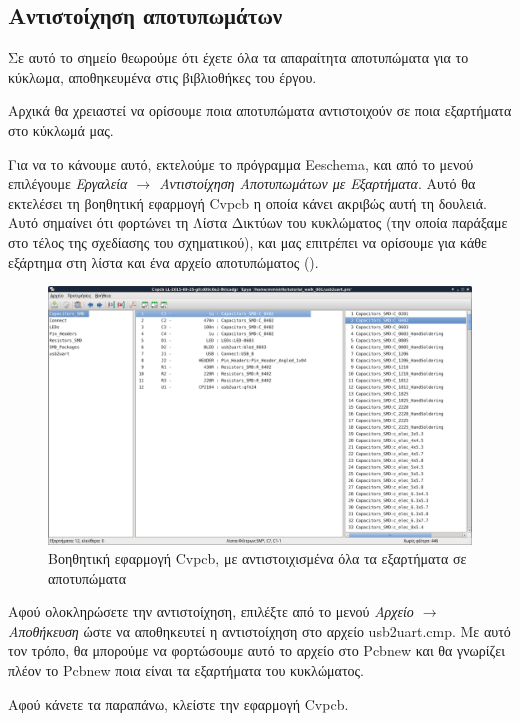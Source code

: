 \documentclass[a4paper]{article}
\begin{document}
\subsection{Αντιστοίχηση αποτυπωμάτων}
Σε αυτό το σημείο θεωρούμε ότι έχετε όλα τα απαραίτητα αποτυπώματα για το κύκλωμα, αποθηκευμένα στις βιβλιοθήκες του έργου.

Αρχικά θα χρειαστεί να ορίσουμε ποια αποτυπώματα αντιστοιχούν σε ποια εξαρτήματα στο κύκλωμά μας. 

Για να το κάνουμε αυτό, εκτελούμε το πρόγραμμα Eeschema, και από το μενού επιλέγουμε \textit{Εργαλεία $\rightarrow$ Αντιστοίχηση Αποτυπωμάτων με Εξαρτήματα}. Αυτό θα εκτελέσει τη βοηθητική εφαρμογή \textenglish{Cvpcb} η οποία κάνει ακριβώς αυτή τη δουλειά. Αυτό σημαίνει ότι φορτώνει τη Λίστα Δικτύων του κυκλώματος (την οποία παράξαμε στο τέλος της σχεδίασης του σχηματικού), και μας επιτρέπει να ορίσουμε για κάθε εξάρτημα στη λίστα και ένα αρχείο αποτυπώματος (\label{ref:cvpcb-wind-main}).

\begin{figure}
  \begin{center}
    \includegraphics[width=.9\textwidth]{img/cvpcb-wind-main.png}
    \caption{Βοηθητική εφαρμογή \textenglish{Cvpcb}, με αντιστοιχισμένα όλα τα εξαρτήματα σε αποτυπώματα}
    \label{fig:cvpcb-wind-main}
  \end{center}
\end{figure}

Αφού ολοκληρώσετε την αντιστοίχηση, επιλέξτε από το μενού \textit{Αρχείο $\rightarrow$ Αποθήκευση} ώστε να αποθηκευτεί η αντιστοίχηση στο αρχείο usb2uart.cmp. Με αυτό τον τρόπο, θα μπορούμε να φορτώσουμε αυτό το αρχείο στο Pcbnew και θα γνωρίζει πλέον το Pcbnew ποια είναι τα εξαρτήματα του κυκλώματος. 

Αφού κάνετε τα παραπάνω, κλείστε την εφαρμογή \textenglish{Cvpcb}.
\end{document}
